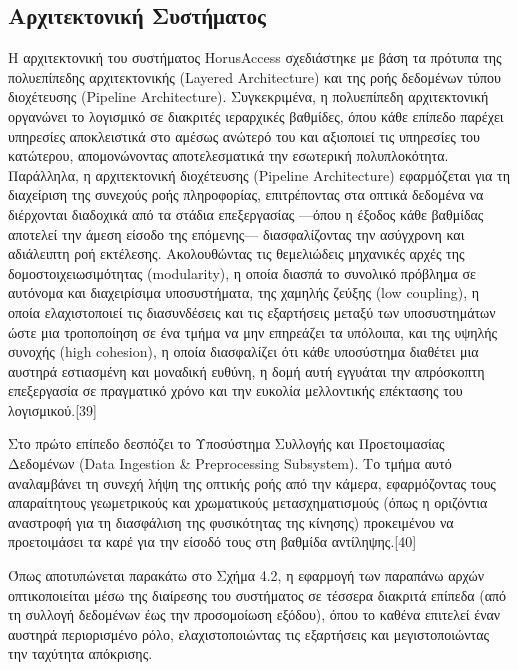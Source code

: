 \documentclass[twoside, a4paper, 11pt]{article}
\begin{document}
\subsection{Αρχιτεκτονική Συστήματος}
Η αρχιτεκτονική του συστήματος HorusAccess σχεδιάστηκε με βάση τα πρότυπα της πολυεπίπεδης αρχιτεκτονικής (Layered Architecture) και της ροής δεδομένων τύπου διοχέτευσης (Pipeline Architecture). Συγκεκριμένα, η πολυεπίπεδη αρχιτεκτονική οργανώνει το λογισμικό σε διακριτές ιεραρχικές βαθμίδες, όπου κάθε επίπεδο παρέχει υπηρεσίες αποκλειστικά στο αμέσως ανώτερό του και αξιοποιεί τις υπηρεσίες του κατώτερου, απομονώνοντας αποτελεσματικά την εσωτερική πολυπλοκότητα. Παράλληλα, η αρχιτεκτονική διοχέτευσης (Pipeline Architecture) εφαρμόζεται για τη διαχείριση της συνεχούς ροής πληροφορίας, επιτρέποντας στα οπτικά δεδομένα να διέρχονται διαδοχικά από τα στάδια επεξεργασίας —όπου η έξοδος κάθε βαθμίδας αποτελεί την άμεση είσοδο της επόμενης— διασφαλίζοντας την ασύγχρονη και αδιάλειπτη ροή εκτέλεσης. Ακολουθώντας τις θεμελιώδεις μηχανικές αρχές της δομοστοιχειωσιμότητας (modularity), η οποία διασπά το συνολικό πρόβλημα σε αυτόνομα και διαχειρίσιμα υποσυστήματα, της χαμηλής ζεύξης (low coupling), η οποία ελαχιστοποιεί τις διασυνδέσεις και τις εξαρτήσεις μεταξύ των υποσυστημάτων ώστε μια τροποποίηση σε ένα τμήμα να μην επηρεάζει τα υπόλοιπα, και της υψηλής συνοχής (high cohesion), η οποία διασφαλίζει ότι κάθε υποσύστημα διαθέτει μια αυστηρά εστιασμένη και μοναδική ευθύνη, η δομή αυτή εγγυάται την απρόσκοπτη επεξεργασία σε πραγματικό χρόνο και την ευκολία μελλοντικής επέκτασης του λογισμικού.[39]

Στο πρώτο επίπεδο δεσπόζει το Υποσύστημα Συλλογής και Προετοιμασίας Δεδομένων (Data Ingestion \& Preprocessing Subsystem). Το τμήμα αυτό αναλαμβάνει τη συνεχή λήψη της οπτικής ροής από την κάμερα, εφαρμόζοντας τους απαραίτητους γεωμετρικούς και χρωματικούς μετασχηματισμούς (όπως η οριζόντια αναστροφή για τη διασφάλιση της φυσικότητας της κίνησης) προκειμένου να προετοιμάσει τα καρέ για την είσοδό τους στη βαθμίδα αντίληψης.[40]

Όπως αποτυπώνεται παρακάτω στο Σχήμα 4.2, η εφαρμογή των παραπάνω αρχών οπτικοποιείται μέσω της διαίρεσης του συστήματος σε τέσσερα διακριτά επίπεδα (από τη συλλογή δεδομένων έως την προσομοίωση εξόδου), όπου το καθένα επιτελεί έναν αυστηρά περιορισμένο ρόλο, ελαχιστοποιώντας τις εξαρτήσεις και μεγιστοποιώντας την ταχύτητα απόκρισης.
\end{document}
